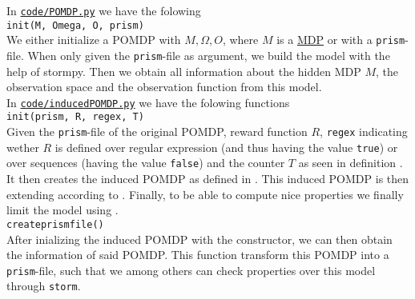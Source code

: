 In \href{https://gitlab.science.ru.nl/srietbergen/thesis/-/blob/master/code/POMDP.py}{\texttt{code/POMDP.py}} we have the folowing\\

\texttt{\textunderscore\textunderscore init\textunderscore\textunderscore (M, Omega, O, prism)}\\
We either initialize a POMDP with $M, \Omega, O$, where $M$ is a \href{https://gitlab.science.ru.nl/srietbergen/thesis/-/blob/master/code/MDP.py}{MDP} or with a \texttt{prism}-file. When only given the \texttt{prism}-file as argument, we build the model with the help of stormpy\cite{g:stormpy}. Then we obtain all information about the hidden MDP $M$, the observation space and the observation function from this model. \\

In \href{https://gitlab.science.ru.nl/srietbergen/thesis/-/blob/master/code/induced_POMDP.py}{\texttt{code/induced\textunderscore POMDP.py}} we have the folowing functions \\

\texttt{\textunderscore\textunderscore init\textunderscore\textunderscore (prism, R, regex, T)}\\
Given the \texttt{prism}-file of the original POMDP, reward function $R$, \texttt{regex} indicating wether $R$ is defined over regular expression (and thus having the value \texttt{true}) or over sequences (having the value \texttt{false}) and the counter $T$ as seen in definition . It then creates the induced POMDP as defined in . This induced POMDP is then extending according to . Finally, to be able to compute nice properties we finally limit the model using .\\

\texttt{create\textunderscore prism\textunderscore file()}\\
After inializing the induced POMDP with the constructor, we can then obtain the information of said POMDP. This function transform this POMDP into a \texttt{prism}-file, such that we among others can check properties over this model through \texttt{storm}\cite{g:storm}.